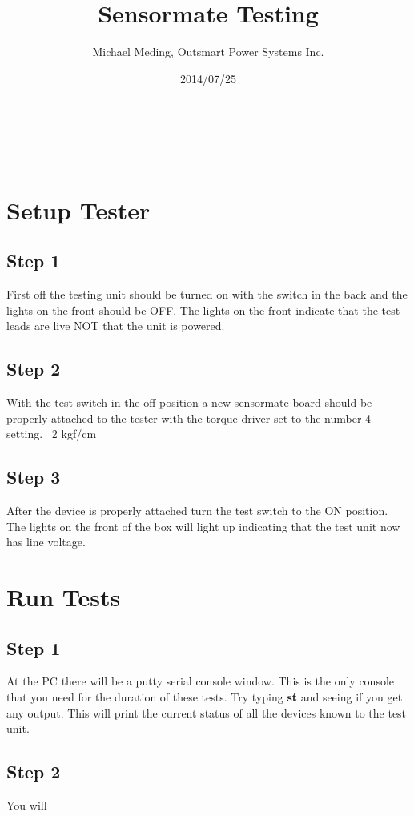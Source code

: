 \documentclass[a4paper,11pt]{article}
\makeatletter
\renewcommand{\maketitle}{
\begin{center}
\vspace{2ex}
{\huge \textsc{\@title}}
\vspace{1ex}
\\
\linia\\
\@author \hfill \@date
\vspace{4ex}
\end{center}
}
\makeatother
\begin{document}
\title{Sensormate Testing}

\author{Michael Meding, Outsmart Power Systems Inc.}

\date{2014/07/25}

\maketitle

\section*{Setup Tester}
\subsection*{Step 1}
First off the testing unit should be turned on with the switch in the back and the lights on the front should be OFF. The lights on the front indicate that the test leads are live NOT that the unit is powered.
\subsection*{Step 2}
With the test switch in the off position a new  sensormate board should be properly attached to the tester with the torque driver set to the number 4 setting. ~2 kgf/cm
\subsection*{Step 3}
After the device is properly attached turn the test switch to the ON position. The lights on the front of the box will light up indicating that the test unit now has line voltage.

\section*{Run Tests}
\subsection*{Step 1}
At the PC there will be a putty serial console window. This is the only console that you need for the duration of these tests. Try typing \textbf{st} and seeing if you get any output. This will print the current status of all the devices known to the test unit. 
\subsection*{Step 2}
You will 
\end{document}
